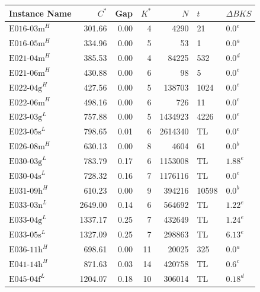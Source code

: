 \begin{table}[!h]
    \centering
    \small
    \begin{tabular}{lrrrrll}
        \toprule
        Instance Name       & $C^*$   & Gap  & $K^*$ & $N$     & $t$   & $\Delta BKS$    \\
        \midrule
        $\text{E016-03m}^H$ & 301.66  & 0.00 & 4     & 4290    & 21    & $\text{0.0}^e$  \\
        $\text{E016-05m}^H$ & 334.96  & 0.00 & 5     & 53      & 1     & $\text{0.0}^a$  \\
        $\text{E021-04m}^H$ & 385.53  & 0.00 & 4     & 84225   & 532   & $\text{0.0}^d$  \\
        $\text{E021-06m}^H$ & 430.88  & 0.00 & 6     & 98      & 5     & $\text{0.0}^e$  \\
        $\text{E022-04g}^H$ & 427.56  & 0.00 & 5     & 138703  & 1024  & $\text{0.0}^e$  \\
        $\text{E022-06m}^H$ & 498.16  & 0.00 & 6     & 726     & 11    & $\text{0.0}^c$  \\
        $\text{E023-03g}^L$ & 757.88  & 0.00 & 5     & 1434923 & 4226  & $\text{0.0}^e$  \\
        $\text{E023-05s}^L$ & 798.65  & 0.01 & 6     & 2614340 & TL    & $\text{0.0}^e$  \\
        $\text{E026-08m}^H$ & 630.13  & 0.00 & 8     & 4604    & 61    & $\text{0.0}^b$  \\
        $\text{E030-03g}^L$ & 783.79  & 0.17 & 6     & 1153008 & TL    & $\text{1.88}^e$ \\
        $\text{E030-04s}^L$ & 728.32  & 0.16 & 7     & 1176116 & TL    & $\text{0.0}^e$  \\
        $\text{E031-09h}^H$ & 610.23  & 0.00 & 9     & 394216  & 10598 & $\text{0.0}^b$  \\
        $\text{E033-03n}^L$ & 2649.00 & 0.14 & 6     & 564692  & TL    & $\text{1.22}^e$ \\
        $\text{E033-04g}^L$ & 1337.17 & 0.25 & 7     & 432649  & TL    & $\text{1.24}^e$ \\
        $\text{E033-05s}^L$ & 1327.09 & 0.25 & 7     & 298863  & TL    & $\text{6.13}^e$ \\
        $\text{E036-11h}^H$ & 698.61  & 0.00 & 11    & 20025   & 325   & $\text{0.0}^a$  \\
        $\text{E041-14h}^H$ & 871.63  & 0.03 & 14    & 420758  & TL    & $\text{0.6}^c$  \\
        $\text{E045-04f}^L$ & 1204.07 & 0.18 & 10    & 306014  & TL    & $\text{0.18}^d$ \\

\end{tabular}
\end{table}
